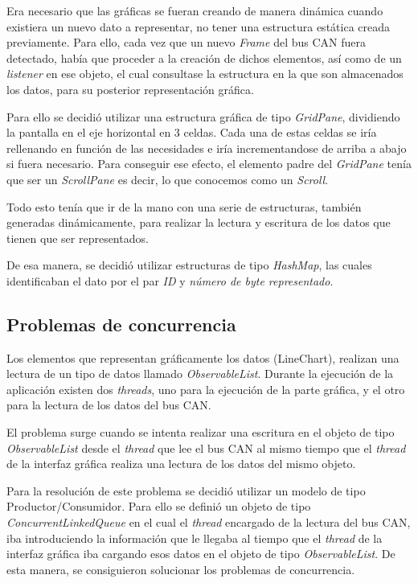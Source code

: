 Era necesario que las gráficas se fueran creando de manera dinámica cuando existiera un nuevo dato a representar, no tener una estructura estática creada previamente. Para ello, cada vez que un nuevo \emph{Frame} del bus CAN fuera detectado, había que proceder a la creación de dichos elementos, así como de un \emph{listener} en ese objeto, el cual consultase la estructura en la que son almacenados los datos, para su posterior representación gráfica.

Para ello se decidió utilizar una estructura gráfica de tipo \emph{GridPane}, dividiendo la pantalla en el eje horizontal en 3 celdas. Cada una de estas celdas se iría rellenando en función de las necesidades e iría incrementandose de arriba a abajo si fuera necesario. Para conseguir ese efecto, el elemento padre del \emph{GridPane} tenía que ser un \emph{ScrollPane} es decir, lo que conocemos como un \emph{Scroll}.

Todo esto tenía que ir de la mano con una serie de estructuras, también generadas dinámicamente, para realizar la lectura y escritura de los datos que tienen que ser representados.

De esa manera, se decidió utilizar estructuras de tipo \emph{HashMap}, las cuales identificaban el dato por el par \emph{ID} y \emph{número de byte representado}.

\subsection{Problemas de concurrencia}\label{problemas_de_concurrencia}

Los elementos que representan gráficamente los datos (LineChart), realizan una lectura de un tipo de datos llamado \emph{ObservableList}. Durante la ejecución de la aplicación existen dos \emph{threads}, uno para la ejecución de la parte gráfica, y el otro para la lectura de los datos del bus CAN.

El problema surge cuando se intenta realizar una escritura en el objeto de tipo \emph{ObservableList} desde el \emph{thread} que lee el bus CAN al mismo tiempo que el \emph{thread} de la interfaz gráfica realiza una lectura de los datos del mismo objeto.

Para la resolución de este problema se decidió utilizar un modelo de tipo Productor/Consumidor. Para ello se definió un objeto de tipo \emph{ConcurrentLinkedQueue} en el cual el \emph{thread} encargado de la lectura del bus CAN, iba introduciendo la información que le llegaba al tiempo que el \emph{thread} de la interfaz gráfica iba cargando esos datos en el objeto de tipo \emph{ObservableList}. De esta manera, se consiguieron solucionar los problemas de concurrencia.

